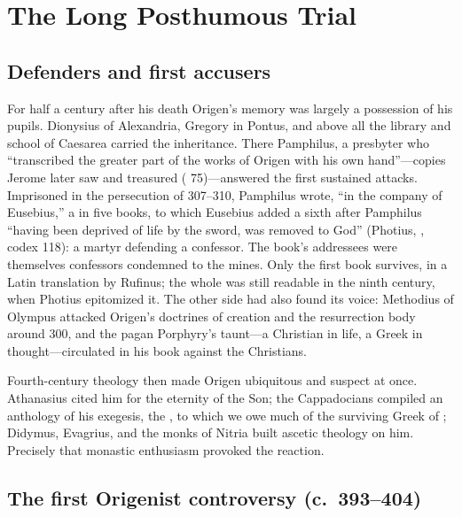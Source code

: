 \section{The Long Posthumous Trial}

\subsection{Defenders and first accusers}

For half a century after his death Origen's memory was largely a possession
of his pupils. Dionysius of Alexandria, Gregory in Pontus, and above all the
library and school of Caesarea carried the inheritance. There Pamphilus, a
presbyter who ``transcribed the greater part of the works of Origen with his
own hand''---copies Jerome later saw and treasured ( 75)---answered the first sustained attacks. Imprisoned in the
persecution of 307--310, Pamphilus wrote, ``in the company of Eusebius,'' a
 in five books, to which Eusebius added a sixth
after Pamphilus ``having been deprived of life by the sword, was removed to
God'' (Photius, , codex 118): a martyr defending a
confessor. The book's addressees were themselves confessors condemned to
the mines. Only the first book survives, in a Latin translation by Rufinus;
the whole was still readable in the ninth century, when Photius epitomized
it. The other side had also found its voice: Methodius of Olympus attacked
Origen's doctrines of creation and the resurrection body around 300, and
the pagan Porphyry's taunt---a Christian in life, a Greek in
thought---circulated in his book against the Christians.

Fourth-century theology then made Origen ubiquitous and suspect at once.
Athanasius cited him for the eternity of the Son; the Cappadocians compiled
an anthology of his exegesis, the , to which we owe much of
the surviving Greek of ; Didymus, Evagrius, and
the monks of Nitria built ascetic theology on him. Precisely that monastic
enthusiasm provoked the reaction.

\subsection{The first Origenist controversy (c.~393--404)}


